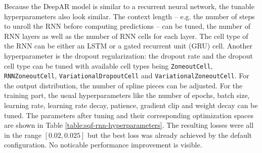 Because the DeepAR model is similar to a recurrent neural network, 
the tunable hyperparameters also look similar. 
The context length -- e.g. the number of steps to unroll the RNN 
before computing predictions -- can be tuned, 
the number of RNN layers as well as the number of RNN cells for each layer. 
The cell type of the RNN can be either an LSTM or a gated recurrent unit (GRU) cell.
Another hyperparameter is the dropout regularization: 
the dropout rate and the dropout cell type can be tuned 
with available cell types being \texttt{ZoneoutCell}, 
\texttt{RNNZoneoutCell}, \texttt{VariationalDropoutCell} 
and \texttt{VariationalZoneoutCell}.
For the output distribution, the number of spline pieces can be adjusted.
For the training part, the usual hyperparameters like the number of epochs, batch size, 
learning rate, learning rate decay, patience, gradient clip and weight decay can be tuned.
The parameters after tuning and their corresponding optimization spaces 
are shown in Table \ref{table:sqf-rnn-hyperparameters}.
The resulting losses were all in the range \([0.02, 0.025]\) but the best loss 
was already achieved by the default configuration. No noticable performance improvement is visible.

